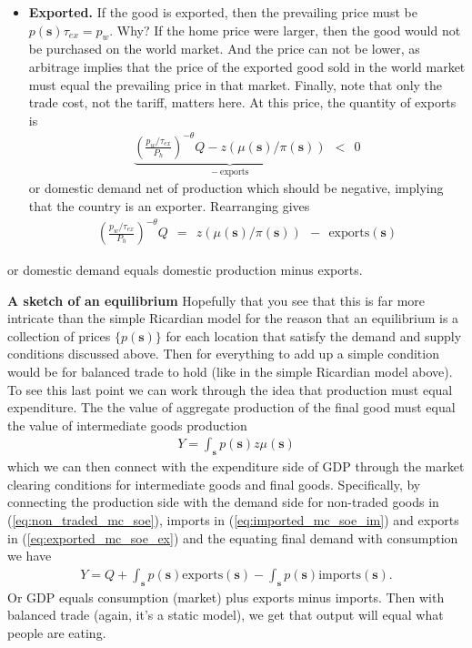 \documentclass[pdftex,12pt]{article}
\begin{document}
\begin{itemize}
\item \textbf{Exported.} If the good is exported, then the prevailing price must be $p(\textbf{s})\tau_{ex} = p_w$. Why? If the home price were larger, then the good would not be purchased on the world market. And the price can not be lower, as arbitrage implies that the price of the exported good sold in the world market must equal the prevailing price in that market. Finally, note that only the trade cost, not the tariff, matters here. At this price, the quantity of exports is
    \begin{align}
 \underbrace{  \left(\frac{p_w/\tau_{ex}}{P_h}\right)^{-\theta}Q- z\left( \mu(\textbf{s}) / \pi(\textbf{s})\right)}_{- \ \mbox{exports}} \ \ < \ \ 0
 \label{eq:exported_mc_soe}
    \end{align}
    or domestic demand net of production which should be negative, implying that the country is an exporter. Rearranging gives
    \begin{align}
 \left(\frac{p_w/\tau_{ex}}{P_h}\right)^{-\theta}Q \ \ = \ \  z\left( \mu(\textbf{s}) / \pi(\textbf{s})\right)  \ \ - \ \  \mbox{exports}(\textbf{s})
 \label{eq:exported_mc_soe_ex}
    \end{align}
\end{itemize}
or domestic demand equals domestic production minus exports.

\medskip
\noindent \textbf{A sketch of an equilibrium} Hopefully that you see that this is far more intricate than the simple Ricardian model for the reason that an equilibrium is a collection of prices $\{ p(\textbf{s})\}$ for each location that satisfy the demand and supply conditions discussed above. Then for everything to add up a simple condition would be for balanced trade to hold (like in the simple Ricardian model above). To see this last point we can work through the idea that production must equal expenditure. The the value of aggregate production of the final good must equal the value of intermediate goods production
\begin{align}
    Y = \int_{\textbf{s}} p(\textbf{s})z \mu(\textbf{s})
\end{align}
which we can then connect with the expenditure side of GDP through the market clearing conditions for intermediate goods and final goods. Specifically, by connecting the production side with the demand side for non-traded goods in (\ref{eq:non_traded_mc_soe}), imports in (\ref{eq:imported_mc_soe_im}) and exports in  (\ref{eq:exported_mc_soe_ex}) and the equating final demand with consumption we have
\begin{align}
    Y = Q +  \int_{\textbf{s}}p(\textbf{s})\mbox{exports}(\textbf{s}) - \int_{\textbf{s}}p(\textbf{s})\mbox{imports}(\textbf{s}).
\label{eq:production_side_gdp}
\end{align}
Or GDP equals consumption (market) plus exports minus imports. Then with balanced trade (again, it's a static model), we get that output will equal what people are eating.
\end{document}
